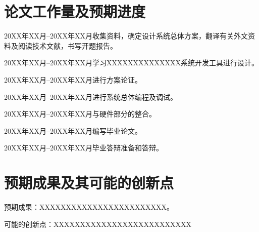 \documentclass{sdjuproposal}
\begin{document}
\section{论文工作量及预期进度}

\begin{schedule}
  \item{20XX年XX月--20XX年XX月}{收集资料，确定设计系统总体方案，翻译有关外文资料及阅读技术文献，书写开题报告。}
  \item{20XX年XX月--20XX年XX月}{学习XXXXXXXXXXXXXX系统开发工具进行设计。}
  \item{20XX年XX月--20XX年XX月}{进行方案论证。}
  \item{20XX年XX月--20XX年XX月}{进行系统总体编程及调试。}
  \item{20XX年XX月--20XX年XX月}{与硬件部分的整合。}
  \item{20XX年XX月--20XX年XX月}{编写毕业论文。}
  \item{20XX年XX月--20XX年XX月}{毕业答辩准备和答辩。}
\end{schedule}

\section{预期成果及其可能的创新点}

预期成果：XXXXXXXXXXXXXXXXXXXXXXXX。

可能的创新点：XXXXXXXXXXXXXXXXXXXXXXXXXX

\nocite{*}
\sdjubibliography

\supervisoropinion{}   %
\committeeopinion
\end{document}
